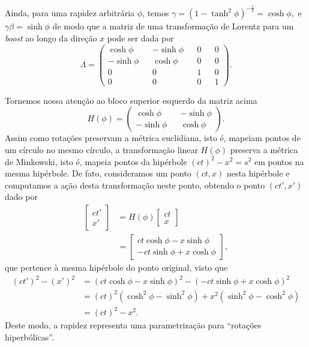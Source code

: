 \documentclass[12pt,a4paper]{article}
\numberwithin{equation}{section}
\begin{document}
Ainda, para uma rapidez arbitrária \(\phi\), temos \( \gamma = \left(1 - \tanh^2\phi\right)^{-\frac12} = \cosh \phi, \) e \( \gamma \beta =  \sinh \phi \) de modo que a matriz de uma transformação de Lorentz para um \textit{boost} ao longo da direção \(x\) pode ser dada por
\begin{equation*}
    \Lambda = \begin{pmatrix}
        \cosh \phi && -\sinh \phi && 0 && 0\\
        -\sinh \phi && \cosh \phi && 0 && 0\\
        0 && 0 && 1 && 0 \\
        0 && 0 && 0 && 1
    \end{pmatrix}.
\end{equation*}

Tornemos nossa atenção ao bloco superior esquerdo da matriz acima
\begin{equation*}
    H(\phi) = \begin{pmatrix}
        \cosh \phi && -\sinh \phi\\
        -\sinh \phi && \cosh \phi
    \end{pmatrix}.
\end{equation*}
Assim como rotações preservam a métrica euclidiana, isto é, mapeiam pontos de um círculo no mesmo círculo, a transformação linear \(H(\phi)\) preserva a métrica de Minkowski, isto é, mapeia pontos da hipérbole \((ct)^2 - x^2 = s^2\) em pontos na mesma hipérbole. De fato, consideramos um ponto \((ct, x)\) nesta hipérbole e computamos a ação desta transformação neste ponto, obtendo o ponto \((ct', x')\) dado por
\begin{align*}
    \begin{bmatrix}ct'\\x'\end{bmatrix} &= H(\phi) \begin{bmatrix}ct\\x\end{bmatrix}\\
                                        &= \begin{bmatrix} ct \cosh \phi - x\sinh \phi\\ -ct\sinh \phi + x \cosh \phi \end{bmatrix},
\end{align*}
que pertence à mesma hipérbole do ponto original, visto que
\begin{align*}
    (ct')^2 - (x')^2 &= (ct \cosh \phi - x \sinh \phi)^2 - (-ct \sinh \phi + x \cosh \phi)^2\\
                     &= (ct)^2 \left(\cosh^2 \phi - \sinh^2 \phi\right) + x^2 \left(\sinh^2 \phi - \cosh^2 \phi\right)\\
                     &= (ct)^2 - x^2.
\end{align*}
Deste modo, a rapidez representa uma parametrização para \enquote{rotações hiperbólicas}.
\end{document}

